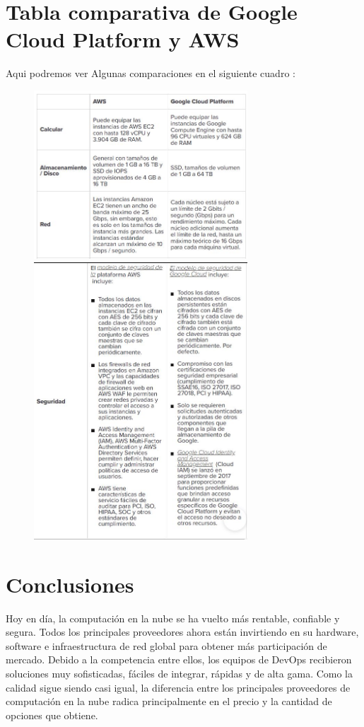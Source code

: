 \documentclass[11pt]{article}
\begin{document}
\section{Tabla comparativa de Google Cloud Platform y AWS}
\endlength
Aqui podremos ver Algunas comparaciones en el siguiente cuadro :
\begin{figure}[htb]
\begin{center}
\includegraphics[width=8cm]{./images/imagen3.jpg}
\includegraphics[width=8cm]{./images/imagen4.jpg}
\end{center}
\end{figure}

\section{Conclusiones}

Hoy en día, la computación en la nube se ha vuelto más rentable, confiable y segura. Todos los principales proveedores ahora están invirtiendo en su hardware, software e infraestructura de red global para obtener más participación de mercado. Debido a la competencia entre ellos, los equipos de DevOps recibieron soluciones muy sofisticadas, fáciles de integrar, rápidas y de alta gama. Como la calidad sigue siendo casi igual, la diferencia entre los principales proveedores de computación en la nube radica principalmente en el precio y la cantidad de opciones que obtiene.
\end{document}
